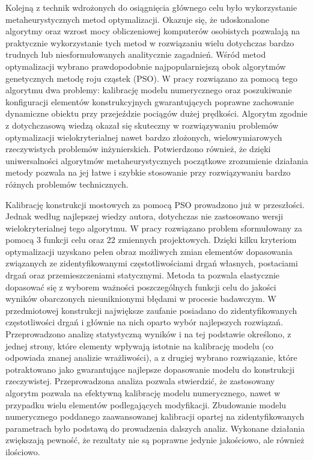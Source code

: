 Kolejną z technik wdrożonych do osiągnięcia głównego celu było wykorzystanie metaheurystycznych metod optymalizacji. Okazuje się, że udoskonalone algorytmy oraz wzrost mocy obliczeniowej komputerów osobistych pozwalają na praktycznie wykorzystanie tych metod w rozwiązaniu wielu dotychczas bardzo trudnych lub niesformułowanych analitycznie zagadnień. Wśród metod optymalizacji wybrano prawdopodobnie najpopularniejszą obok algorytmów genetycznych metodę roju cząstek (PSO). W pracy rozwiązano za pomocą tego algorytmu dwa problemy: kalibrację modelu numerycznego oraz poszukiwanie konfiguracji elementów konstrukcyjnych gwarantujących poprawne zachowanie dynamiczne obiektu przy przejeździe pociągów dużej prędkości. Algorytm zgodnie z dotychczasową wiedzą okazał się skuteczny w rozwiązywaniu problemów optymalizacji wielokryterialnej nawet bardzo złożonych, wielowymiarowych rzeczywistych problemów inżynierskich. Potwierdzono również, że dzięki uniwersalności algorytmów metaheurystycznych początkowe zrozumienie działania metody pozwala na jej łatwe i szybkie stosowanie przy rozwiązywaniu bardzo różnych problemów technicznych. 

Kalibrację konstrukcji mostowych za pomocą PSO prowadzono już w przeszłości. Jednak według najlepszej wiedzy autora, dotychczas nie zastosowano wersji wielokryterialnej tego algorytmu. W pracy rozwiązano problem sformułowany za pomocą 3 funkcji celu oraz 22 zmiennych projektowych. Dzięki kilku kryteriom optymalizacji uzyskano pełen obraz możliwych zmian elementów dopasowania związanych ze zidentyfikowanymi częstotliwościami drgań własnych, postaciami drgań oraz przemieszczeniami statycznymi. Metoda ta pozwala elastycznie dopasować się z wyborem ważności poszczególnych funkcji celu do jakości wyników obarczonych nieuniknionymi błędami w procesie badawczym. W przedmiotowej konstrukcji największe zaufanie posiadano do zidentyfikowanych częstotliwości drgań i głównie na nich oparto wybór najlepszych rozwiązań. Przeprowadzono analizę statystyczną wyników i na tej podstawie określono, z jednej strony, które elementy wpływają istotnie na kalibrację modelu (co odpowiada znanej analizie wrażliwości), a z drugiej wybrano rozwiązanie, które potraktowano jako gwarantujące najlepsze dopasowanie modelu do konstrukcji rzeczywistej. Przeprowadzona analiza pozwala stwierdzić, że zastosowany algorytm pozwala na efektywną kalibrację modelu numerycznego, nawet w przypadku wielu elementów podlegających modyfikacji. Zbudowanie modelu numerycznego poddanego zaawansowanej kalibracji opartej na zidentyfikowanych parametrach było podstawą do prowadzenia dalszych analiz. Wykonane działania zwiększają pewność, że rezultaty nie są poprawne jedynie jakościowo, ale również ilościowo. 

